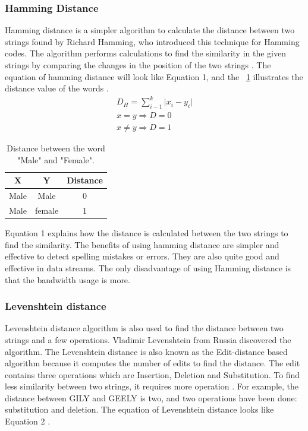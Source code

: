 \subsubsection{Hamming Distance}
Hamming distance is a simpler algorithm to calculate the distance between two strings found by Richard Hamming, who introduced this technique for Hamming codes. The algorithm performs calculations to find the similarity in the given strings by comparing the changes in the position of the two strings \cite{Tok2015}. The equation of hamming distance will look like Equation 1, and the ~\ref{tab:hammingTable} illustrates the distance value of the words \cite{Saed2021}.
\begin{equation}
	\label{eq:hamming}
	\begin{aligned}	
	{D_H} = \sum_{i-1}^{k} \vert {x_i} - {y_i}\vert \\
	x = y\Rightarrow D = 0 \\
	x \neq y\Rightarrow D = 1
	\end{aligned}
\end{equation}

\begin{table}[h!]
	\begin{center}
		\begin{tabular}{ |c|c|c| } 
			\hline
			X & Y & Distance \\
			\hline
			Male & Male & 0 \\ 
			Male & female & 1 \\ 
			\hline
		\end{tabular}
		\caption{Distance between the word "Male" and "Female".}\label{tab:hammingTable}
	\end{center} 
\end{table} 

Equation 1 explains how the distance is calculated between the two strings to find the similarity. The benefits of using hamming distance are simpler and effective to detect spelling mistakes or errors. They are also quite good and effective in data streams. The only disadvantage of using Hamming distance is that the bandwidth usage is more.
\subsubsection{Levenshtein distance}
Levenshtein distance algorithm is also used to find the distance between two strings and a few operations. Vladimir Levenshtein from Russia discovered the algorithm. The Levenshtein distance is also known as the Edit-distance based algorithm because it computes the number of edits to find the distance. The edit contains three operations which are Insertion, Deletion and Substitution. To find less similarity between two strings, it requires more operation \cite{ChSa2019}. For example, the distance between GILY and GEELY is two, and two operations have been done: substitution and deletion. The equation of Levenshtein distance looks like Equation 2 \cite{Cuelogic}.


